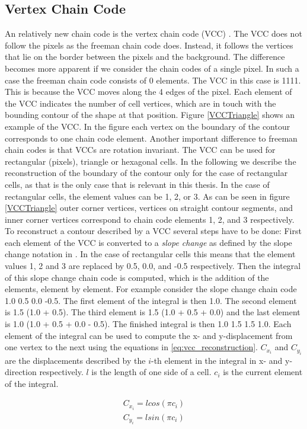 \documentclass[thesis.tex]{subfiles}
\begin{document}
\subsection{Vertex Chain Code}
\label{section:vertex_chain_code}
An relatively new chain code is the vertex chain code (VCC) \cite{vertex_chain_code}. The VCC does not follow the pixels as the freeman chain code does. Instead, it follows the vertices that lie on the border between the pixels and the background. The difference becomes more apparent if we consider the chain codes of a single pixel. In such a case the freeman chain code consists of 0 elements. The VCC in this case is 1111. This is because the VCC moves along the 4 edges of the pixel. Each element of the VCC indicates the number of cell vertices, which are in touch with the bounding contour of the shape at that position. Figure \ref{VCCTriangle} shows an example of the VCC. In the figure each vertex on the boundary of the contour corresponds to one chain code element. Another important difference to freeman chain codes is that VCCs are rotation invariant. The VCC can be used for rectangular (pixels), triangle or hexagonal cells. In the following we describe the reconstruction of the boundary of the contour only for the case of rectangular cells, as that is the only case that is relevant in this thesis. In the case of rectangular cells, the element values can be 1, 2, or 3. As can be seen in figure \ref{VCCTriangle} outer corner vertices, vertices on straight contour segments, and inner corner vertices correspond to chain code elements 1, 2, and 3 respectively. \\ To reconstruct a contour described by a VCC several steps have to be done: First each element of the VCC is converted to a \textit{slope change} as defined by the slope change notation in \cite{slope_change_notation}. In the case of rectangular cells this means that the element values 1, 2 and 3 are replaced by 0.5, 0.0, and -0.5 respectively. Then the integral of this slope change chain code is computed, which is the addition of the elements, element by element. For example consider the slope change chain code 1.0 0.5 0.0 -0.5. The first element of the integral is then 1.0. The second element is 1.5 (1.0 + 0.5). The third element is 1.5 (1.0 + 0.5 + 0.0) and the last element is 1.0 (1.0 + 0.5 + 0.0 - 0.5). The finished integral is then 1.0 1.5 1.5 1.0. Each element of the integral can be used to compute the x- and y-displacement from one vertex to the next using the equations in \ref{eq:vcc_reconstruction}. $C_{x_i}$ and $C_{y_i}$ are the displacements described by the $i$-th element in the integral in x- and y-direction respectively. $l$ is the length of one side of a cell. $c_i$ is the current element of the integral. 

\begin{equation} \label{eq:vcc_reconstruction}
\begin{split} 
C_{x_i} = l  cos(\pi c_i) \\
C_{y_i} = l  sin(\pi c_i) \\
\end{split}
\end{equation}



\subfilebib %
\end{document}
